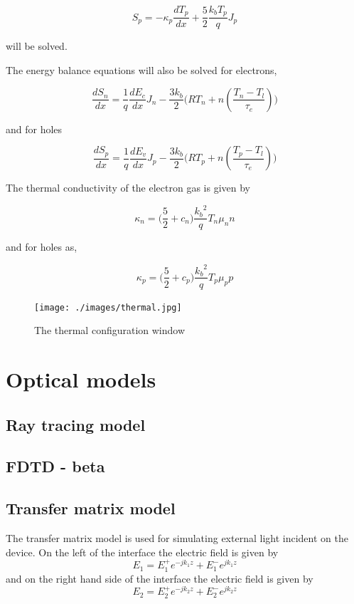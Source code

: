 \documentclass[11pt]{article}
\begin{document}
\begin{equation}
S_p=-\kappa_p \frac{dT_{p}}{dx}+\frac{5}{2} \frac{k_{b}T_{p}}{q} J_{p}
\end{equation}

will be solved.

The energy balance equations will also be solved for electrons,

\begin{equation}
\frac{dS_{n}}{dx}=\frac{1}{q}\frac{dE_{c}}{dx} J_{n}-\frac{3 k_{b}}{2} \Bigg( R T_{n}+ n(\frac{T_{n}-T_{l}}{\tau_{e}}) \Bigg)
\end{equation}

and for holes

\begin{equation}
\frac{dS_{p}}{dx}=\frac{1}{q}\frac{dE_{v}}{dx} J_{p}-\frac{3 k_{b}}{2} \Bigg( R T_{p}+ n(\frac{T_{p}-T_{l}}{\tau_{e}}) \Bigg)
\end{equation}

The thermal conductivity of the electron gas is given by

\begin{equation}
\kappa_{n}=\Bigg ( \frac{5}{2} +c_n\Bigg) \frac{{k_{b}}^2}{q} T_{n} \mu_n n
\end{equation}

and for holes as,

\begin{equation}
\kappa_{p}=\Bigg ( \frac{5}{2} +c_p\Bigg) \frac{{k_{b}}^2}{q} T_{p} \mu_p p
\end{equation}


\begin{figure}[!htb]
\centering
\texttt{[image: ./images/thermal.jpg]}
{\caption{The thermal configuration window}}
\label{fig:thermal}
\end{figure}


\newpage

\section{Optical models}
\subsection{Ray tracing model}
\subsection{FDTD - beta}
\subsection{Transfer matrix model}
The transfer matrix model is used for simulating external light incident on the device. 
On the left of the interface the electric field is given by
\begin{equation}
E_{1}=E^{+}_{1} e^{-j k_1 z}+E^{-}_{1} e^{j k_1 z}
\label{efield1}
\end{equation}
and on the right hand side of the interface the electric field is given by
\begin{equation}
E_{2}=E^{+}_{2} e^{-j k_2 z}+E^{-}_{2} e^{j k_2 z}
\label{efield2}
\end{equation}
\end{document}
